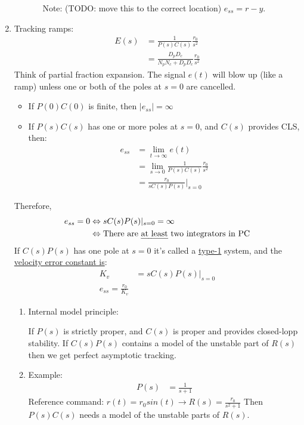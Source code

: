 \begin{enumerate}
\begin{enumerate}
\begin{enumerate}
                            Note: (TODO: move this to the correct location) $e_{ss} = r - y$.
                    \end{enumerate}
            \end{enumerate}
        \item Tracking ramps:
            \begin{align*}
                E(s) &= \frac{1}{P(s)C(s)} \frac{r_0}{s^2} \\
                &= \frac{D_p D_c}{N_p N_c + D_p D_c} \frac{r_0}{s^2}
            \end{align*}
            Think of partial fraction expansion. The signal $e(t)$ will blow up (like a ramp) unless one or both of the poles at $s = 0$ are cancelled.
            \begin{itemize}
                \item If $P(0)C(0)$ is finite, then $|e_{ss}| = \infty$
                \item If $P(s)C(s)$ has one or more poles at $s = 0$, and $C(s)$ provides CLS, then:
                    \begin{align*}
                        e_{ss} &= \lim_{t \to \infty}e(t) \\
                        &= \lim_{s \to 0} \frac{1}{P(s)C(s)} \frac{r_0}{s^2} \\
                        &= \frac{r_0}{s C(s)P(s)} |_{s=0}
                    \end{align*}
            \end{itemize}
            Therefore,
            \begin{align*}
                e_{ss} = 0 &\Leftrightarrow sC(s)P(s) |_{s=0} = \infty \\
                &\Leftrightarrow \text{There are \uline{at least} two integrators in PC}
            \end{align*}
            If $C(s)P(s)$ has one pole at $s = 0$ it's called a \uline{type-1} system, and the \uline{velocity error constant is}:
            \begin{align*}
                K_v &= s C(s)P(s)|_{s = 0}\\
                e_{ss} = \frac{r_0}{K_v}
            \end{align*}
            \begin{enumerate}
                \item Internal model principle:

                    If $P(s)$ is strictly proper, and $C(s)$ is proper and provides closed-lopp stability. If $C(s)P(s)$ contains a model of the unstable part of $R(s)$ then we get perfect asymptotic tracking.
                \item Example:
                    \begin{align*}
                        P(s) &= \frac{1}{s+1}
                    \end{align*}
                    Reference command: $r(t) = r_0 sin(t) \rightarrow R(s) = \frac{r_0}{s^2 + 1}$
                    Then $P(s)C(s)$ needs a model of the unstable parts of $R(s)$.


\end{enumerate}
\end{enumerate}
